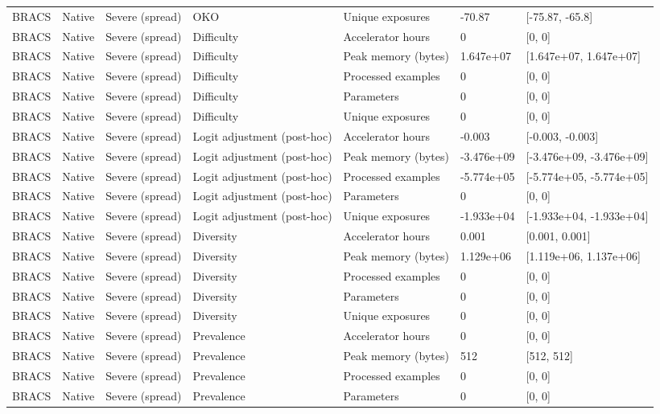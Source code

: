 \begin{longtable}{lllllll}
BRACS & Native & Severe (spread) & OKO & Unique exposures & -70.87 & [-75.87, -65.8] \\
BRACS & Native & Severe (spread) & Difficulty & Accelerator hours & 0 & [0, 0] \\
BRACS & Native & Severe (spread) & Difficulty & Peak memory (bytes) & 1.647e+07 & [1.647e+07, 1.647e+07] \\
BRACS & Native & Severe (spread) & Difficulty & Processed examples & 0 & [0, 0] \\
BRACS & Native & Severe (spread) & Difficulty & Parameters & 0 & [0, 0] \\
BRACS & Native & Severe (spread) & Difficulty & Unique exposures & 0 & [0, 0] \\
BRACS & Native & Severe (spread) & Logit adjustment (post-hoc) & Accelerator hours & -0.003 & [-0.003, -0.003] \\
BRACS & Native & Severe (spread) & Logit adjustment (post-hoc) & Peak memory (bytes) & -3.476e+09 & [-3.476e+09, -3.476e+09] \\
BRACS & Native & Severe (spread) & Logit adjustment (post-hoc) & Processed examples & -5.774e+05 & [-5.774e+05, -5.774e+05] \\
BRACS & Native & Severe (spread) & Logit adjustment (post-hoc) & Parameters & 0 & [0, 0] \\
BRACS & Native & Severe (spread) & Logit adjustment (post-hoc) & Unique exposures & -1.933e+04 & [-1.933e+04, -1.933e+04] \\
BRACS & Native & Severe (spread) & Diversity & Accelerator hours & 0.001 & [0.001, 0.001] \\
BRACS & Native & Severe (spread) & Diversity & Peak memory (bytes) & 1.129e+06 & [1.119e+06, 1.137e+06] \\
BRACS & Native & Severe (spread) & Diversity & Processed examples & 0 & [0, 0] \\
BRACS & Native & Severe (spread) & Diversity & Parameters & 0 & [0, 0] \\
BRACS & Native & Severe (spread) & Diversity & Unique exposures & 0 & [0, 0] \\
BRACS & Native & Severe (spread) & Prevalence & Accelerator hours & 0 & [0, 0] \\
BRACS & Native & Severe (spread) & Prevalence & Peak memory (bytes) & 512 & [512, 512] \\
BRACS & Native & Severe (spread) & Prevalence & Processed examples & 0 & [0, 0] \\
BRACS & Native & Severe (spread) & Prevalence & Parameters & 0 & [0, 0] \\

\end{longtable}
